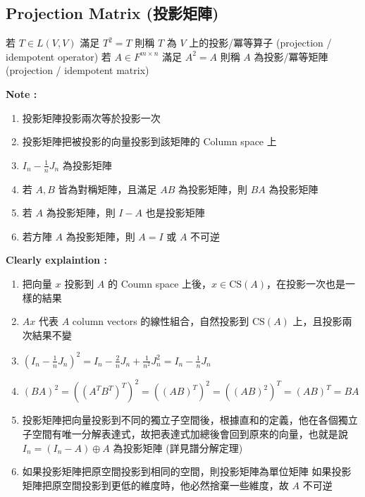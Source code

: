 \documentclass[
]{book}
\providecommand{\tightlist}{%
  \setlength{\itemsep}{0pt}\setlength{\parskip}{0pt}}
\begin{document}
\hypertarget{projection-matrix-ux6295ux5f71ux77e9ux9663}{%
\subsection{Projection Matrix (投影矩陣)}\label{projection-matrix-ux6295ux5f71ux77e9ux9663}}

若 \(T \in L(V,V)\) 滿足 \(T^2 = T\) 則稱 \(T\) 為 \(V\) 上的投影/冪等算子 (projection / idempotent operator)
若 \(A \in F^{m\times n}\) 滿足 \(A^2 = A\) 則稱 \(A\) 為投影/冪等矩陣 (projection / idempotent matrix)

\textbf{Note :}

\begin{enumerate}
\def\labelenumi{\arabic{enumi}.}
\tightlist
\item
  投影矩陣投影兩次等於投影一次
\item
  投影矩陣把被投影的向量投影到該矩陣的 Column space 上
\item
  \(I_n - \frac{1}{n}J_n\) 為投影矩陣
\item
  若 \(A,B\) 皆為對稱矩陣，且滿足 \(AB\) 為投影矩陣，則 \(BA\) 為投影矩陣
\item
  若 \(A\) 為投影矩陣，則 \(I - A\) 也是投影矩陣
\item
  若方陣 \(A\) 為投影矩陣，則 \(A = I\) 或 \(A\) 不可逆
\end{enumerate}

\textbf{Clearly explaintion :}

\begin{enumerate}
\def\labelenumi{\arabic{enumi}.}
\tightlist
\item
  把向量 \(x\) 投影到 \(A\) 的 Coumn space 上後，\(x \in \mbox{CS}(A)\)，在投影一次也是一樣的結果
\item
  \(Ax\) 代表 \(A\) column vectors 的線性組合，自然投影到 \(\mbox{CS}(A)\) 上，且投影兩次結果不變
\item
  \((I_n - \frac{1}{n}J_n)^2 = I_n - \frac{2}{n}J_n + \frac{1}{n^2}J_n^2 = I_n - \frac{1}{n}J_n\)
\item
  \((BA)^2 = ((A^TB^T)^T)^2 = ((AB)^T)^2 = ((AB)^2)^T = (AB)^T = BA\)
\item
  投影矩陣把向量投影到不同的獨立子空間後，根據直和的定義，他在各個獨立子空間有唯一分解表達式，故把表達式加總後會回到原來的向量，也就是說 \(I_n = (I_n - A) \oplus A\) 為投影矩陣 (詳見譜分解定理)
\item
  如果投影矩陣把原空間投影到相同的空間，則投影矩陣為單位矩陣
  如果投影矩陣把原空間投影到更低的維度時，他必然捨棄一些維度，故 \(A\) 不可逆
\end{enumerate}
\end{document}
